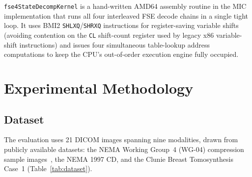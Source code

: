 \documentclass[journal]{IEEEtran}
\begin{document}
\texttt{fse4StateDecompKernel} is a hand-written AMD64 assembly routine in
the MIC implementation that runs all four interleaved FSE decode chains in a
single tight loop. It uses BMI2 \texttt{SHLXQ}/\texttt{SHRXQ} instructions
for register-saving variable shifts (avoiding contention on the \texttt{CL}
shift-count register used by legacy x86 variable-shift instructions) and
issues four simultaneous table-lookup address computations to keep the CPU's
out-of-order execution engine fully occupied.

\section{Experimental Methodology}
\label{sec:methodology}

\subsection{Dataset}

The evaluation uses 21 DICOM images spanning nine modalities, drawn
from publicly available datasets: the NEMA Working Group~4 (WG-04)
compression sample images~\cite{nema_wg04}, the NEMA 1997 CD, and the
Clunie Breast Tomosynthesis Case~1 (Table~\ref{tab:dataset}).
\end{document}
